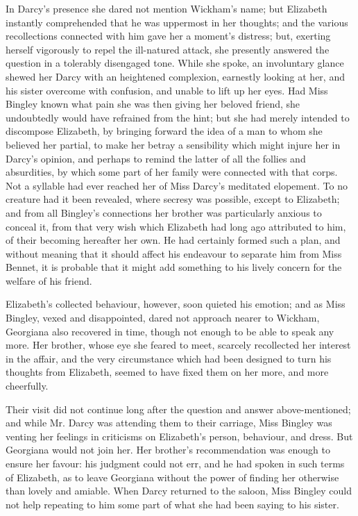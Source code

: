 In Darcy’s presence she dared not mention Wickham’s
name; but Elizabeth instantly comprehended that he was
uppermost in her thoughts; and the various recollections
connected with him gave her a moment’s distress; but,
exerting herself vigorously to repel the ill-natured attack,
she presently answered the question in a tolerably disengaged
tone. While she spoke, an involuntary glance
shewed her Darcy with an heightened complexion, earnestly
looking at her, and his sister overcome with confusion,
and unable to lift up her eyes. Had Miss Bingley known
what pain she was then giving her beloved friend, she
undoubtedly would have refrained from the hint; but she
had merely intended to discompose Elizabeth, by bringing
forward the idea of a man to whom she believed her
partial, to make her betray a sensibility which might
injure her in Darcy’s opinion, and perhaps to remind the
latter of all the follies and absurdities, by which some part
of her family were connected with that corps. Not a
syllable had ever reached her of Miss Darcy’s meditated
elopement. To no creature had it been revealed, where
secresy was possible, except to Elizabeth; and from all
Bingley’s connections her brother was particularly anxious
to conceal it, from that very wish which Elizabeth had
long ago attributed to him, of their becoming hereafter
her own. He had certainly formed such a plan, and
without meaning that it should affect his endeavour to
separate him from Miss Bennet, it is probable that it
might add something to his lively concern for the welfare
of his friend.

Elizabeth’s collected behaviour, however, soon quieted
his emotion; and as Miss Bingley, vexed and disappointed,
dared not approach nearer to Wickham, Georgiana also
recovered in time, though not enough to be able to speak
any more. Her brother, whose eye she feared to meet,
scarcely recollected her interest in the affair, and the very
circumstance which had been designed to turn his thoughts
from Elizabeth, seemed to have fixed them on her more,
and more cheerfully.

Their visit did not continue long after the question
and answer above-mentioned; and while Mr. Darcy was
attending them to their carriage, Miss Bingley was venting
her feelings in criticisms on Elizabeth’s person, behaviour,
and dress. But Georgiana would not join her. Her
brother’s recommendation was enough to ensure her
favour: his judgment could not err, and he had spoken
in such terms of Elizabeth, as to leave Georgiana without
the power of finding her otherwise than lovely and amiable.
When Darcy returned to the saloon, Miss Bingley could
not help repeating to him some part of what she had been
saying to his sister.

